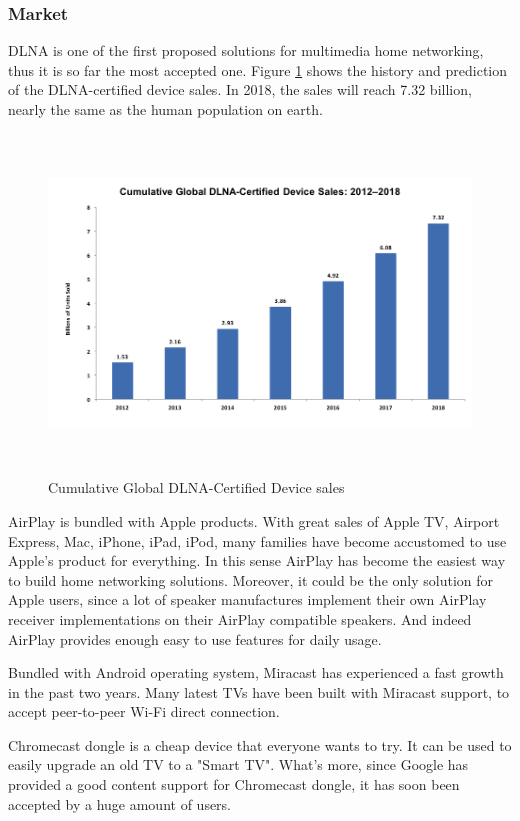 \subsubsection{Market\label{2_3_2}} 
DLNA is one of the first proposed solutions for multimedia home 
networking, thus it is so far the most accepted one. Figure 
\ref{dlna_market} shows the history and prediction of the DLNA-certified device sales. In 2018, the 
sales will reach 7.32 billion, nearly the same as the human population on earth.

\begin{figure}[htb] 
\centering \includegraphics[height=9cm]{charts/dlna_market} 
\caption{Cumulative Global DLNA-Certified Device sales \label{dlna_market}} 
\end{figure}
 
AirPlay is bundled with Apple products. With great sales of Apple TV, Airport Express, 
Mac, iPhone, iPad, iPod, many families have become accustomed to use Apple's product for everything. In this sense AirPlay has become the easiest way to build home networking solutions. Moreover, it could be the only solution for Apple users, since a lot of speaker manufactures implement their own AirPlay receiver implementations on their AirPlay compatible speakers. And indeed AirPlay provides enough easy to use features for daily usage.

Bundled with Android operating system, Miracast has experienced a fast growth in 
the past two years. Many latest TVs have been built with Miracast support, to accept peer-to-peer Wi-Fi direct connection.

Chromecast dongle is a cheap device that everyone wants to try. It can be used
to easily upgrade an old TV to a "Smart TV".  What's more, since Google has
provided a good content support for Chromecast dongle, it has soon been accepted
by a huge amount of users.

